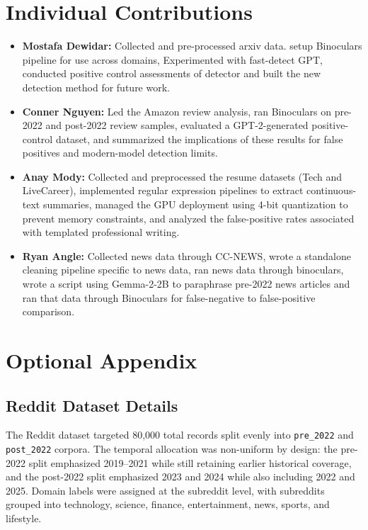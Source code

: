 \documentclass[11pt]{article}
\begin{document}



\appendix
\section{Individual Contributions}
\begin{itemize}
    \item \textbf{Mostafa Dewidar:} Collected and pre-processed arxiv data. setup Binoculars pipeline for use across domains, Experimented with fast-detect GPT, conducted positive control assessments of detector and built the new detection method for future work.
    \item \textbf{Conner Nguyen:} Led the Amazon review analysis, ran
    Binoculars on pre-2022 and post-2022 review samples, evaluated a
    GPT-2-generated positive-control dataset, and summarized the implications
    of these results for false positives and modern-model detection limits.
    \item \textbf{Anay Mody:} Collected and preprocessed the resume datasets (Tech and LiveCareer), implemented regular expression pipelines to extract continuous-text summaries, managed the GPU deployment using 4-bit quantization to prevent memory constraints, and analyzed the false-positive rates associated with templated professional writing.
    \item \textbf{Ryan Angle:} Collected news data through CC-NEWS, wrote a standalone cleaning pipeline specific to news data, ran news data through binoculars, wrote a script using Gemma-2-2B to paraphrase pre-2022 news articles and ran that data through Binoculars for false-negative to false-positive comparison.
\end{itemize}

\section{Optional Appendix}
\subsection{Reddit Dataset Details}
The Reddit dataset targeted 80,000 total records split evenly into
\texttt{pre\_2022} and \texttt{post\_2022} corpora. The temporal allocation was
non-uniform by design: the pre-2022 split emphasized 2019--2021 while still
retaining earlier historical coverage, and the post-2022 split emphasized 2023
and 2024 while also including 2022 and 2025. Domain labels were assigned at
the subreddit level, with subreddits grouped into technology, science,
finance, entertainment, news, sports, and lifestyle.
\end{document}

